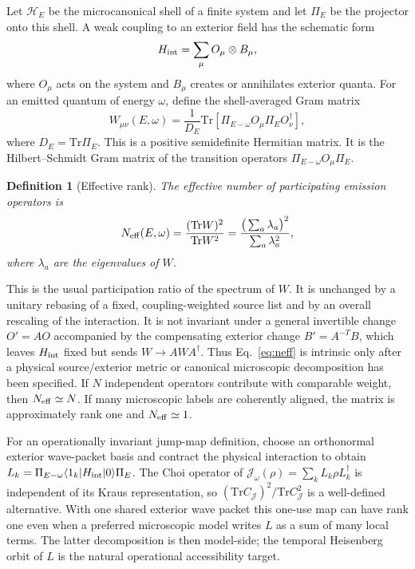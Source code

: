 \documentclass[12pt]{article}
\newtheorem{definition}{Definition}
\newcommand{\be}{\begin{equation}}
\newcommand{\ee}{\end{equation}}
\newcommand{\Tr}{\mathrm{Tr}}
\newcommand{\Neff}{N_{\rm eff}}
\begin{document}
Let $\mathcal H_E$ be the microcanonical shell of a finite system and
let $\Pi_E$ be the projector onto this shell.  A weak coupling to an
exterior field has the schematic form
\be
  H_{\rm int}
  =
  \sum_\mu O_\mu\otimes B_\mu ,
\ee
where $O_\mu$ acts on the system and $B_\mu$ creates or annihilates
exterior quanta.  For an emitted quantum of energy $\omega$, define the
shell-averaged Gram matrix
\be
  W_{\mu\nu}(E,\omega)
  =
  \frac{1}{D_E}
  \Tr\!\left[
    \Pi_{E-\omega} O_\mu \Pi_E O_\nu^\dagger
  \right],
\label{eq:gram}
\ee
where $D_E=\Tr\Pi_E$.  This is a positive semidefinite Hermitian matrix.
It is the Hilbert--Schmidt Gram matrix of the transition operators
$\Pi_{E-\omega}O_\mu\Pi_E$.

\begin{definition}[Effective rank]
\label{def:neff}
The effective number of participating emission operators is
\be
  \Neff(E,\omega)
  =
  \frac{(\Tr W)^2}{\Tr W^2}
  =
  \frac{\big(\sum_a\lambda_a\big)^2}{\sum_a\lambda_a^2},
\label{eq:neff}
\ee
where $\lambda_a$ are the eigenvalues of $W$.
\end{definition}

This is the usual participation ratio of the spectrum of $W$.  It is
unchanged by a unitary rebasing of a fixed, coupling-weighted source list and
by an overall rescaling of the interaction.  It is not invariant under a
general invertible change $O'=AO$ accompanied by the compensating exterior
change $B'=A^{-T}B$, which leaves $H_{\rm int}$ fixed but sends
$W\to AWA^\dagger$.  Thus Eq.~\eqref{eq:neff} is intrinsic only after a
physical source/exterior metric or canonical microscopic decomposition has
been specified.  If $N$ independent operators contribute
with comparable weight, then $\Neff\simeq N$.  If many microscopic
labels are coherently aligned, the matrix is approximately rank one and
$\Neff\simeq 1$.

For an operationally invariant jump-map definition, choose an orthonormal
exterior wave-packet basis and contract the physical interaction to obtain
$L_k=\Pi_{E-\omega}\langle1_k|H_{\rm int}|0\rangle\Pi_E$.  The Choi operator
of $\mathcal J_\omega(\rho)=\sum_kL_k\rho L_k^\dagger$ is independent of its
Kraus representation, so $(\Tr C_{\mathcal J})^2/\Tr C_{\mathcal J}^2$ is a
well-defined alternative.  With one shared exterior wave packet this one-use
map can have rank one even when a preferred microscopic model writes $L$ as a
sum of many local terms.  The latter decomposition is then model-side; the
temporal Heisenberg orbit of $L$ is the natural operational accessibility
target.
\end{document}
